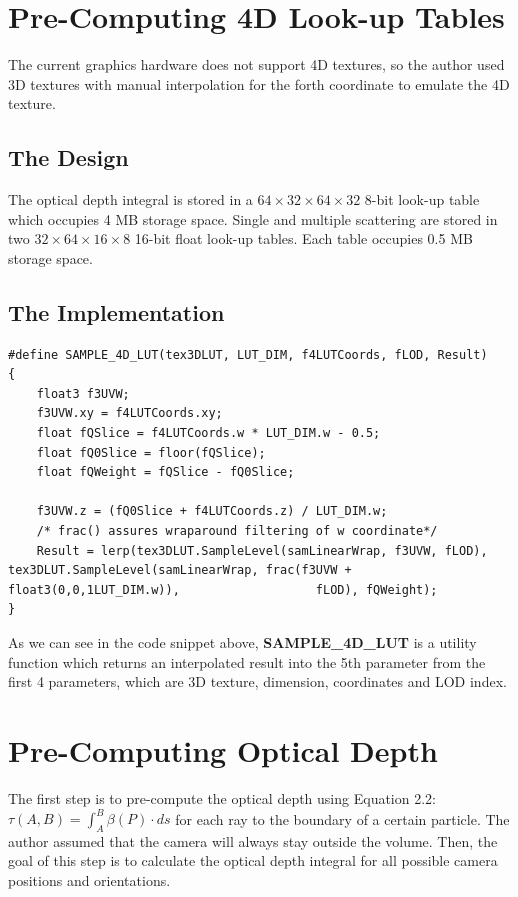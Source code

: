 \section{Pre-Computing 4D Look-up Tables}
The current graphics hardware does not support 4D textures, so the author used 3D textures with manual interpolation for the forth coordinate to emulate the 4D texture. 

\subsection{The Design}
The optical depth integral is stored in a $64\times 32\times 64\times 32$ 8-bit look-up table which occupies 4 MB storage space. Single and multiple scattering are stored in two $32\times 64\times 16\times 8$ 16-bit float look-up tables. Each table occupies 0.5 MB storage space.
\subsection{The Implementation}
\begin{lstlisting}
#define SAMPLE_4D_LUT(tex3DLUT, LUT_DIM, f4LUTCoords, fLOD, Result) 
{                                                              
    float3 f3UVW;                                              
    f3UVW.xy = f4LUTCoords.xy;                                 
    float fQSlice = f4LUTCoords.w * LUT_DIM.w - 0.5;           
    float fQ0Slice = floor(fQSlice);                           
    float fQWeight = fQSlice - fQ0Slice;                       
                                                               
    f3UVW.z = (fQ0Slice + f4LUTCoords.z) / LUT_DIM.w;          
    /* frac() assures wraparound filtering of w coordinate*/ 
    Result = lerp(tex3DLUT.SampleLevel(samLinearWrap, f3UVW, fLOD), 									 tex3DLUT.SampleLevel(samLinearWrap, frac(f3UVW + float3(0,0,1LUT_DIM.w)), 					 fLOD), fQWeight);                                                                          
}
\end{lstlisting}
As we can see in the code snippet above, \textbf{SAMPLE\_4D\_LUT} is a utility function which returns an interpolated result into the 5th parameter from the first 4 parameters, which are 3D texture, dimension, coordinates and LOD index.
\section{Pre-Computing Optical Depth}
The first step is to pre-compute the optical depth using Equation 2.2: $\tau(A, B) = \int_{A}^{B}\beta(P)\cdot ds$ for each ray to the boundary of a certain particle. The author assumed that the camera will always stay outside the volume. Then, the goal of this step is to calculate the optical depth integral for all possible camera positions and orientations.

